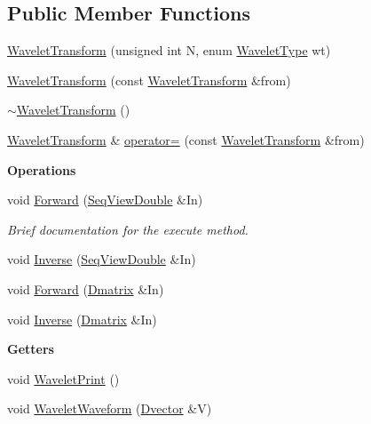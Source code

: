 \subsection*{Public Member Functions}
\begin{DoxyCompactItemize}
\item 
\hyperlink{classtsa_1_1_wavelet_transform_a311a12f22747485e6e3ecb0ede6143a7}{Wavelet\+Transform} (unsigned int N, enum \hyperlink{classtsa_1_1_wavelet_transform_a5a529de70e0004333fcf23b9cca88ce7}{Wavelet\+Type} wt)
\item 
\hyperlink{classtsa_1_1_wavelet_transform_a1ce7211ad9ce11058575e94c15ca2c6e}{Wavelet\+Transform} (const \hyperlink{classtsa_1_1_wavelet_transform}{Wavelet\+Transform} \&from)
\item 
\hyperlink{classtsa_1_1_wavelet_transform_a119186776e4cc28d80d5d8d72cf12a5a}{$\sim$\+Wavelet\+Transform} ()
\item 
\hyperlink{classtsa_1_1_wavelet_transform}{Wavelet\+Transform} \& \hyperlink{classtsa_1_1_wavelet_transform_af8ca4e2e5be0413ef4ed484d27e2ff8b}{operator=} (const \hyperlink{classtsa_1_1_wavelet_transform}{Wavelet\+Transform} \&from)
\end{DoxyCompactItemize}
\begin{Indent}\textbf{ Operations}\par
\begin{DoxyCompactItemize}
\item 
void \hyperlink{classtsa_1_1_wavelet_transform_afb63ce4986e8e123c7a35f5a39bb7600}{Forward} (\hyperlink{namespacetsa_ac599574bcc094eda25613724b8f3ca9e}{Seq\+View\+Double} \&In)
\begin{DoxyCompactList}\small\item\em Brief documentation for the execute method. \end{DoxyCompactList}\item 
void \hyperlink{classtsa_1_1_wavelet_transform_a0e85c6c3970435147e5db3075a437b9f}{Inverse} (\hyperlink{namespacetsa_ac599574bcc094eda25613724b8f3ca9e}{Seq\+View\+Double} \&In)
\item 
void \hyperlink{classtsa_1_1_wavelet_transform_a058f02f4ff2348d1899fda867badc71f}{Forward} (\hyperlink{namespacetsa_ad260cd21c1891c4ed391fe788569aba4}{Dmatrix} \&In)
\item 
void \hyperlink{classtsa_1_1_wavelet_transform_a7bdfd9a5e262f4441bd95bd6d6892e7c}{Inverse} (\hyperlink{namespacetsa_ad260cd21c1891c4ed391fe788569aba4}{Dmatrix} \&In)
\end{DoxyCompactItemize}
\end{Indent}
\begin{Indent}\textbf{ Getters}\par
\begin{DoxyCompactItemize}
\item 
void \hyperlink{classtsa_1_1_wavelet_transform_ae18b8342c7cfd37728a40691ec12f6f5}{Wavelet\+Print} ()
\item 
void \hyperlink{classtsa_1_1_wavelet_transform_ae5d5c1a1fc9b787a4d74c643b8fce1fb}{Wavelet\+Waveform} (\hyperlink{namespacetsa_a8900fb03d849baf447a1a0efe2561fb2}{Dvector} \&V)
\end{DoxyCompactItemize}
\end{Indent}
